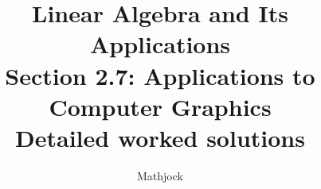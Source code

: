 
\title{\textbf{Linear Algebra and Its Applications}\\[0.3em]Section 2.7: Applications to Computer Graphics\\[0.3em]\large Detailed worked solutions}
\author{Mathjock}
\date{}

\maketitle
\bookinfo
\tableofcontents
\clearpage
\renewcommand{\thesection}{2.\arabic{section}}
\renewcommand{\theHsection}{2.\arabic{section}}
\setcounter{section}{6}


